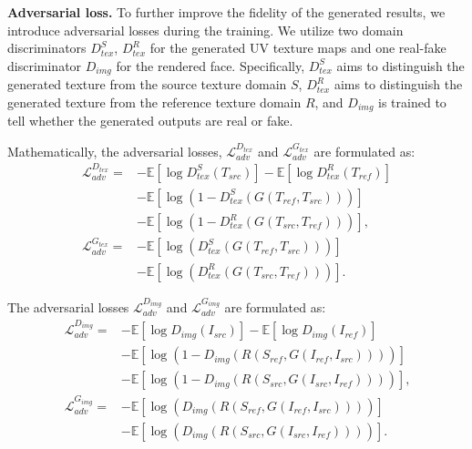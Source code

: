 \documentclass[10pt,journal,compsoc]{IEEEtran}
\begin{document}
{\bf Adversarial loss.}
To further improve the fidelity of the generated results, we introduce adversarial losses during the training. 
We utilize two domain discriminators $D_{tex}^{S}$, $D_{tex}^{R}$ for the generated UV texture maps and one real-fake discriminator $D_{img}$ for the rendered face. 
Specifically, $D_{tex}^{S}$ aims to distinguish the generated texture from the source texture domain $S$, $D_{tex}^{R}$ aims to distinguish the generated texture from the reference texture domain $R$, and $D_{img}$ is trained to tell whether the generated outputs are real or fake.

Mathematically, the adversarial losses, $\mathcal{L}_{adv}^{D_{tex}}$ and $\mathcal{L}_{adv}^{G_{tex}}$ are formulated as: 
\begin{equation}
	\begin{aligned}
  \mathcal{L}_{adv}^{D_{tex}}=&-\mathbb{E}\left[\log D_{tex}^{S}(T_{src})\right]-\mathbb{E}\left[\log D_{tex}^{R}(T_{ref})\right] \\
  &-\mathbb{E}\left[\log \left(1-D_{tex}^{S}(G(T_{ref}, T_{src}))\right)\right] \\
  &-\mathbb{E}\left[\log \left(1-D_{tex}^{R}(G(T_{src}, T_{ref}))\right)\right] \text{,}\\
  \mathcal{L}_{adv}^{G_{tex}}=&-\mathbb{E}\left[\log \left(D_{tex}^{S}(G(T_{ref}, T_{src}))\right)\right] \\
  &-\mathbb{E}\left[\log \left(D_{tex}^{R}(G(T_{src}, T_{ref}))\right)\right] \text{.}
  \end{aligned}
\end{equation}

The adversarial losses $\mathcal{L}_{adv}^{D_{img}}$ and $\mathcal{L}_{adv}^{G_{img}}$ are formulated as: 
\begin{equation}
	\begin{aligned}
  \mathcal{L}_{adv}^{D_{img}}=&-\mathbb{E}\left[\log D_{img}(I_{src})\right]-\mathbb{E}\left[\log D_{img}(I_{ref})\right] \\
  &-\mathbb{E}\left[\log \left(1-D_{img}(R(S_{ref},G(I_{ref}, I_{src})))\right)\right] \\
  &-\mathbb{E}\left[\log \left(1-D_{img}(R(S_{src},G(I_{src}, I_{ref})))\right)\right] \text{,}\\
  \mathcal{L}_{adv}^{G_{img}}=&-\mathbb{E}\left[\log \left(D_{img}(R(S_{ref},G(I_{ref}, I_{src})))\right)\right] \\
  &-\mathbb{E}\left[\log \left(D_{img}(R(S_{src},G(I_{src}, I_{ref})))\right)\right]\text{.}
  \end{aligned}
\end{equation}
\end{document}
